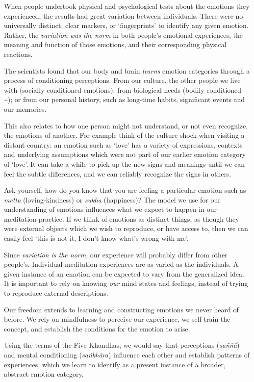 When people undertook physical and psychological tests about the
emotions they experienced, the results had great variation between
individuals. There were no universally distinct, clear markers, or
`fingerprints' to identify any given emotion. Rather, the
\emph{variation was the norm} in both people's emotional experiences,
the meaning and function of those emotions, and their corresponding
physical reactions.

The scientists found that our body and brain \emph{learns} emotion
categories through a process of conditioning perceptions. From our
culture, the other people we live with (socially conditioned emotions);
from biological needs (bodily conditioned \textasciitilde); or from our
personal history, such as long-time habits, significant events and our
memories.

This also relates to how one person might not understand, or not even
recognize, the emotions of another. For example think of the culture
shock when visiting a distant country: an emotion such as `love' has a
variety of expressions, contexts and underlying assumptions which were
not part of our earlier emotion category of `love'. It can take a while
to pick up the new signs and meanings until we can feel the subtle
differences, and we can reliably recognize the signs in others.

Ask yourself, how do you know that you are feeling a particular emotion
such as \emph{metta} (loving-kindness) or \emph{sukha} (happiness)? The
model we use for our understanding of emotions influences what we expect
to happen in our meditation practice. If we think of emotions as
distinct things, as though they were external objects which we wish to
reproduce, or have access to, then we can easily feel `this is not it, I
don't know what's wrong with me'.

Since \emph{variation is the norm}, our experience will probably differ
from other people's. Individual meditation experiences are as varied as
the individuals. A given instance of an emotion can be expected to vary
from the generalized idea. It is important to rely on knowing \emph{our}
mind states and feelings, instead of trying to reproduce external
descriptions.

Our freedom extends to learning and constructing emotions we never heard
of before. We rely on mindfulness to perceive our experience, we
self-train the concept, and establish the conditions for the emotion to
arise.

Using the terms of the Five Khandhas, we would say that perceptions
(\emph{saññā}) and mental conditioning (\emph{saṅkhāra}) influence each
other and establish patterns of experiences, which we learn to identify
as a present instance of a broader, abstract emotion category.

